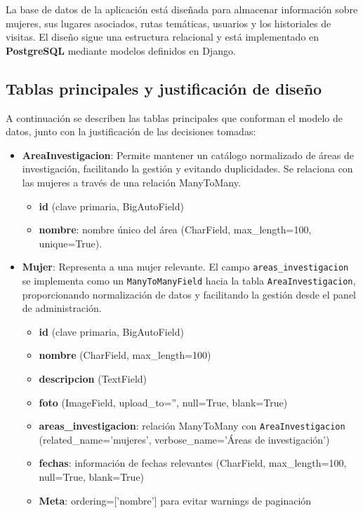 La base de datos de la aplicación está diseñada para almacenar información sobre mujeres, sus lugares asociados, rutas temáticas, usuarios y los historiales de visitas. El diseño sigue una estructura relacional y está implementado en \textbf{PostgreSQL} mediante modelos definidos en Django.

\subsection{Tablas principales y justificación de diseño}

A continuación se describen las tablas principales que conforman el modelo de datos, junto con la justificación de las decisiones tomadas:

\begin{itemize}
    \item \textbf{AreaInvestigacion}: Permite mantener un catálogo normalizado de áreas de investigación, facilitando la gestión y evitando duplicidades. Se relaciona con las mujeres a través de una relación ManyToMany.
    \begin{itemize}
        \item \textbf{id} (clave primaria, BigAutoField)
        \item \textbf{nombre}: nombre único del área (CharField, max\_length=100, unique=True).
    \end{itemize}
    
    \item \textbf{Mujer}: Representa a una mujer relevante. El campo \texttt{areas\_investigacion} se implementa como un \texttt{ManyToManyField} hacia la tabla \texttt{AreaInvestigacion}, proporcionando normalización de datos y facilitando la gestión desde el panel de administración.
    \begin{itemize}
        \item \textbf{id} (clave primaria, BigAutoField)
        \item \textbf{nombre} (CharField, max\_length=100)
        \item \textbf{descripcion} (TextField)
        \item \textbf{foto} (ImageField, upload\_to='', null=True, blank=True)
        \item \textbf{areas\_investigacion}: relación ManyToMany con \texttt{AreaInvestigacion} (related\_name='mujeres', verbose\_name='Áreas de investigación')
        \item \textbf{fechas}: información de fechas relevantes (CharField, max\_length=100, null=True, blank=True)
        \item \textbf{Meta}: ordering=['nombre'] para evitar warnings de paginación
    \end{itemize}
    

\end{itemize}
